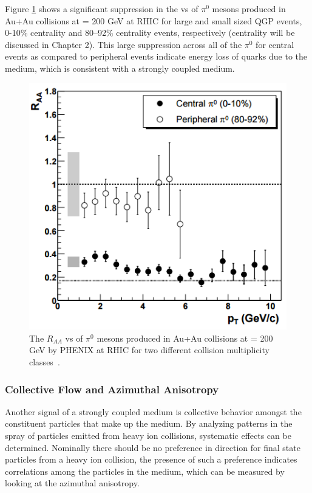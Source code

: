 Figure \ref{fig:RAA_plot} shows a significant suppression in the \raa vs \pt  of $\pi^0$ mesons produced in Au+Au collisions at \sqsn = 200 GeV at RHIC for large and small sized QGP events, 0-10$\%$ centrality and 80--92$\%$ centrality events, respectively (centrality will be discussed in Chapter 2). This large suppression across all  \pt of the $\pi^0$ for central events as compared to peripheral events indicate energy loss of quarks due to the medium, which is consistent with a strongly coupled medium.

\begin{figure}[!ht]
\centering
\includegraphics[width=0.6\linewidth]{figs/raa_pi0_aa_cent_periph.png}
\caption{The $R_{AA}$ vs \pt of $\pi^0$ mesons produced in Au+Au collisions at \sqsn= 200 GeV by PHENIX at RHIC for two different collision multiplicity classes~\cite{PhysRevLett.91.072303}.}
\label{fig:RAA_plot}
\end{figure}
\clearpage

\subsubsection{Collective Flow and Azimuthal Anisotropy}
Another signal of a strongly coupled medium is collective behavior amongst the constituent particles that make up the medium. By analyzing patterns in the spray of particles emitted from heavy ion collisions, systematic effects can be determined. Nominally there should be no preference in direction for final state particles from a heavy ion collision, the presence of such a preference indicates correlations among the particles in the medium, which can be measured by looking at the azimuthal anisotropy.

